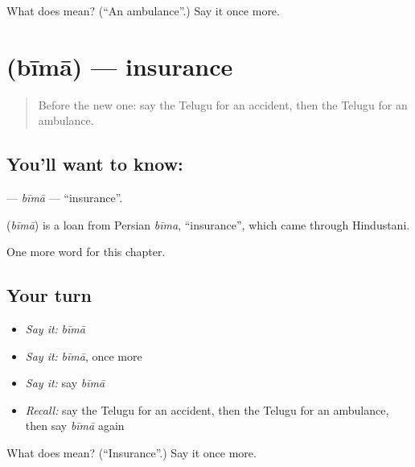 \begin{tcolorbox}[breakable,colback=teal!4,colframe=teal!35!black,title={Before you move on}]
What does  mean? (\textquotedblleft{}An ambulance\textquotedblright{}.) Say it once more.
\end{tcolorbox}
\section[\texorpdfstring{\te{బీమా} (bīmā)}{బీమా (bīmā)}]{ (bīmā) — insurance}

\label{lesson:TE-C287-bima}



\begin{quote}
Before the new one: say the Telugu for an accident, then the Telugu for an ambulance.
\end{quote}

\subsection*{You'll want to know: }
\textbf{} — \emph{bīmā} — \textquotedblleft{}insurance\textquotedblright{}.

\begin{cousinweb}
\textbf{} (\emph{bīmā}) is a loan from Persian \emph{bīma}, \textquotedblleft{}insurance\textquotedblright{}, which came through Hindustani.
\end{cousinweb}

\begin{grammarlens}[title={What you've built}]
One more word for this chapter.
\end{grammarlens}

\subsection*{Your turn}
\begin{itemize}
\raggedright
  \item \emph{Say it:} \emph{bīmā}
  \item \emph{Say it:} \emph{bīmā}, once more
  \item \emph{Say it:} say \emph{bīmā}
  \item \emph{Recall:} say the Telugu for an accident, then the Telugu for an ambulance, then say \emph{bīmā} again
\end{itemize}

\begin{tcolorbox}[breakable,colback=teal!4,colframe=teal!35!black,title={Before you move on}]
What does  mean? (\textquotedblleft{}Insurance\textquotedblright{}.) Say it once more.
\end{tcolorbox}
